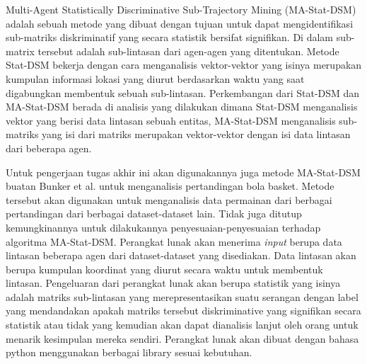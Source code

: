 \documentclass[a4paper,twoside]{article}
\begin{document}
	Multi-Agent Statistically Discriminative Sub-Trajectory Mining (MA-Stat-DSM) adalah sebuah metode yang dibuat dengan tujuan untuk dapat mengidentifikasi sub-matriks diskriminatif yang secara statistik bersifat signifikan.
	Di dalam sub-matrix tersebut adalah sub-lintasan dari agen-agen yang ditentukan.
	Metode Stat-DSM bekerja dengan cara menganalisis vektor-vektor yang isinya merupakan kumpulan informasi lokasi yang diurut berdasarkan waktu yang saat digabungkan membentuk sebuah sub-lintasan.
	Perkembangan dari Stat-DSM dan MA-Stat-DSM berada di analisis yang dilakukan dimana Stat-DSM menganalisis vektor yang berisi data lintasan sebuah entitas, MA-Stat-DSM menganalisis sub-matriks yang isi dari matriks merupakan vektor-vektor dengan isi data lintasan dari beberapa agen.



	Untuk pengerjaan tugas akhir ini akan digunakannya juga metode MA-Stat-DSM buatan Bunker et al. untuk menganalisis pertandingan bola basket. 
	Metode tersebut akan digunakan untuk menganalisis data permainan dari berbagai pertandingan dari berbagai dataset-dataset lain.
	Tidak juga ditutup kemungkinannya untuk dilakukannya penyesuaian-penyesuaian terhadap algoritma MA-Stat-DSM.
	Perangkat lunak akan menerima {\it input} berupa data lintasan beberapa agen dari dataset-dataset yang disediakan.
	Data lintasan akan berupa kumpulan koordinat yang diurut secara waktu untuk membentuk lintasan.
	Pengeluaran dari perangkat lunak akan berupa statistik yang isinya adalah matriks sub-lintasan yang merepresentasikan suatu serangan dengan label yang mendandakan apakah matriks tersebut diskriminative yang signifikan secara statistik atau tidak yang kemudian akan dapat dianalisis lanjut oleh orang untuk menarik kesimpulan mereka sendiri. 
	Perangkat lunak akan dibuat dengan bahasa python menggunakan berbagai library sesuai kebutuhan.
\end{document}
